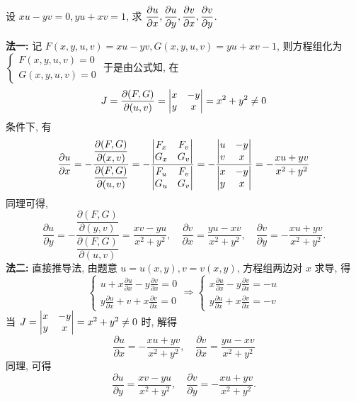 \begin{example}
    设 $xu-yv=0, yu+xv=1$, 求 $\displaystyle \pdv{u}{x},\pdv{u}{y},\pdv{v}{x}, \pdv{v}{y}$.
\end{example}
\begin{solution}
    \textbf{法一: }记 $F(x,y,u,v)=xu-yv, G(x,y,u,v)=yu+xv-1$, 则方程组化为 $\begin{cases}
            F(x,y,u,v)=0 \\ G(x,y,u,v)=0
        \end{cases}$ 于是由公式知, 在
    $$J=\dfrac{\partial (F,G)}{\partial (u,v)}=\mqty|x&-y\\ y& x|=x^2+y^2\neq0$$
    条件下, 有
    $$
        \pdv{u}{x}=-\dfrac{\displaystyle \pdv{(F,G)}{(x,v)}}{\displaystyle \pdv{(F,G)}{(u,v)}}=-\dfrac{\mqty|F_x&F_v\\G_x&G_v|}{\mqty|F_u&F_v\\G_u&G_v|}=-\dfrac{\mqty|u&-y\\v&x|}{\mqty|x&-y\\ y& x|}=-\dfrac{xu+yv}{x^2+y^2}
    $$
    同理可得,
    $$\dfrac{\partial u}{\partial y}=-\dfrac{\dfrac{\partial(F, G)}{\partial(y, v)}}{\dfrac{\partial(F, G)}{\partial(u, v)}}=\dfrac{x v-y u}{x^{2}+y^{2}}, \quad \dfrac{\partial v}{\partial x}=\dfrac{y u-x v}{x^{2}+y^{2}}, \quad \dfrac{\partial v}{\partial y}=-\dfrac{x u+y v}{x^{2}+y^{2}} .$$
    \textbf{法二: }直接推导法, 由题意 $ u=u(x, y), v=v(x, y) $, 方程组两边对 $ x $ 求导, 得
    $$
        \begin{cases}
            \displaystyle u + x \frac { \partial u } { \partial x } - y \frac { \partial v } { \partial x } = 0 \\[6pt]
            \displaystyle y \frac { \partial u } { \partial x } + v + x \frac { \partial v } { \partial x } = 0
        \end{cases}\Rightarrow\begin{cases}
            \displaystyle x \frac{\partial u}{\partial x}-y \frac{\partial v}{\partial x}=-u \\
            \displaystyle y \frac{\partial u}{\partial x}+x \frac{\partial v}{\partial x}=-v
        \end{cases}
    $$
    当 $ J=\mqty|x & -y \\ y & x|=x^{2}+y^{2} \neq 0 $ 时, 解得
    $$\frac{\partial u}{\partial x}=-\frac{x u+y v}{x^{2}+y^{2}}, \quad \frac{\partial v}{\partial x}=\frac{y u-x v}{x^{2}+y^{2}}$$
    同理, 可得
    $$
        \frac{\partial u}{\partial y}=\frac{x v-y u}{x^{2}+y^{2}}, \quad \frac{\partial v}{\partial y}=-\frac{x u+y v}{x^{2}+y^{2}} .
$$
\end{solution}

